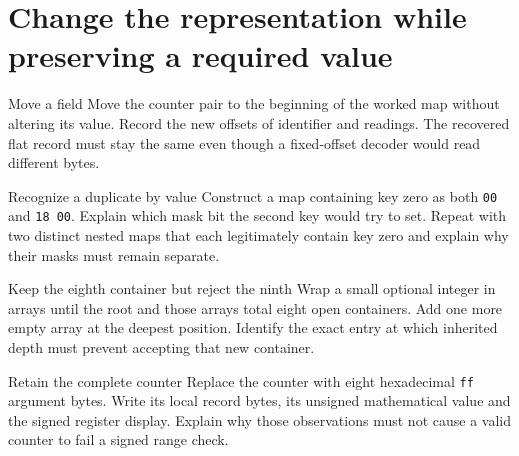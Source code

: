 \section{Change the representation while preserving a required value}
\begin{MARSExercise}{Move a field}
  Move the counter pair to the beginning of the worked map without altering its value.
  Record the new offsets of identifier and readings. The recovered flat record must stay
  the same even though a fixed-offset decoder would read different bytes.
\end{MARSExercise}

\begin{MARSExercise}{Recognize a duplicate by value}
  Construct a map containing key zero as both \texttt{00} and \texttt{18 00}. Explain which
  mask bit the second key would try to set. Repeat with two distinct nested maps that
  each legitimately contain key zero and explain why their masks must remain separate.
\end{MARSExercise}

\begin{MARSExercise}{Keep the eighth container but reject the ninth}
  Wrap a small optional integer in arrays until the root and those arrays total eight
  open containers. Add one more empty array at the deepest position. Identify the exact
  entry at which inherited depth must prevent accepting that new container.
\end{MARSExercise}

\begin{MARSExercise}{Retain the complete counter}
  Replace the counter with eight hexadecimal \texttt{ff} argument bytes. Write its local
  record bytes, its unsigned mathematical value and the signed register display. Explain
  why those observations must not cause a valid counter to fail a signed range check.
\end{MARSExercise}
